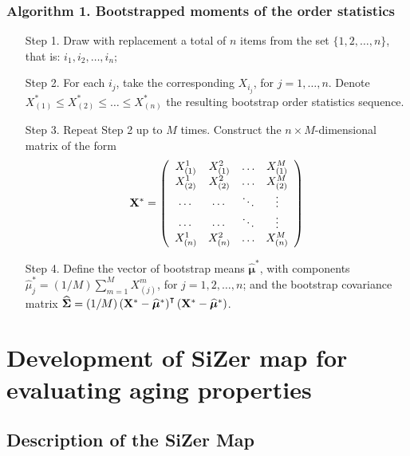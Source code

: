 \documentclass[preprint,12pt]{elsarticle}
\begin{document}
\subsubsection*{Algorithm 1. Bootstrapped moments of the order statistics}
\begin{enumerate}
\item[Step 1.] Draw with replacement a total of $n$ items from the set $\{1,2, \ldots, n\}$, that is: $i_1,i_2, \ldots, i_n$;
\item[Step 2.] For each $i_j$, take the corresponding $X_{i_j}$, for $j=1,\ldots, n$. Denote $X^*_{(1)} \leq X^*_{(2)}\leq  \ldots \leq X^*_{(n)}$ the resulting bootstrap order statistics sequence.  
\item[Step 3.] Repeat Step 2 up to $M$ times. Construct the $n \times M$-dimensional matrix of the form
$${\bf X}^*=\left(\begin{array} {cccc}
                     X^1_{(1)} & X^2_{(1)}&  \ldots & X^M_{(1)} \\
                     X^1_{(2)} & X^2_{(2)}&  \ldots & X^M_{(2)} \\
										 \cdots    & \cdots   &  \ddots  & \vdots    \\
										 \cdots    & \cdots   &  \ddots  & \vdots    \\
										 X^1_{(n)} & X^2_{(n)}&  \ldots & X^M_{(n)} \\
              \end{array}\right)$$
\item[Step 4.] Define the vector of bootstrap means $\widehat{\boldsymbol \mu}^*$, with components $\widehat{ \mu}_j^*=(1/M)\sum_{m=1}^M X_{(j)}^m$, for $j=1,2, \ldots, n$; and the bootstrap covariance matrix  $\widehat{\boldsymbol \Sigma}=(1/M)\left({\bf X}^*-\widehat{\boldsymbol \mu}^*\right)^{\intercal}\left({\bf X}^*-\widehat{\boldsymbol \mu}^*\right)$.
\end{enumerate}




\newpage

\section{Development of SiZer map for evaluating aging properties}
\subsection{Description of the SiZer Map}
\end{document}
